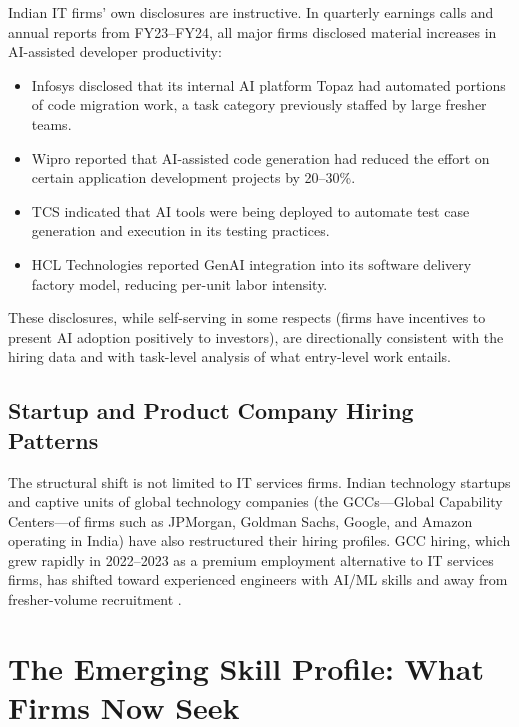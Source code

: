\documentclass[conference]{IEEEtran}
\begin{document}
Indian IT firms' own disclosures are instructive. In quarterly earnings calls and annual reports from FY23--FY24, all major firms disclosed material increases in AI-assisted developer productivity:

\begin{itemize}
    \item Infosys disclosed that its internal AI platform Topaz had automated portions of code migration work, a task category previously staffed by large fresher teams.
    \item Wipro reported that AI-assisted code generation had reduced the effort on certain application development projects by 20--30\%.
    \item TCS indicated that AI tools were being deployed to automate test case generation and execution in its testing practices.
    \item HCL Technologies reported GenAI integration into its software delivery factory model, reducing per-unit labor intensity.
\end{itemize}

These disclosures, while self-serving in some respects (firms have incentives to present AI adoption positively to investors), are directionally consistent with the hiring data and with task-level analysis of what entry-level work entails.

\subsection{Startup and Product Company Hiring Patterns}

The structural shift is not limited to IT services firms. Indian technology startups and captive units of global technology companies (the GCCs---Global Capability Centers---of firms such as JPMorgan, Goldman Sachs, Google, and Amazon operating in India) have also restructured their hiring profiles. GCC hiring, which grew rapidly in 2022--2023 as a premium employment alternative to IT services firms, has shifted toward experienced engineers with AI/ML skills and away from fresher-volume recruitment \cite{nasscom2024gcc}.

\section{The Emerging Skill Profile: What Firms Now Seek}
\label{sec:skills}
\end{document}
